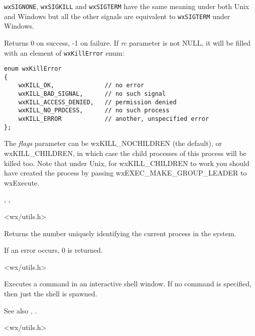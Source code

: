 {\tt wxSIGNONE}, {\tt wxSIGKILL} and {\tt wxSIGTERM} have the same meaning
under both Unix and Windows but all the other signals are equivalent to
{\tt wxSIGTERM} under Windows.

Returns 0 on success, -1 on failure. If {\it rc} parameter is not NULL, it will
be filled with an element of {\tt wxKillError} enum:

\begin{verbatim}
enum wxKillError
{
    wxKILL_OK,              // no error
    wxKILL_BAD_SIGNAL,      // no such signal
    wxKILL_ACCESS_DENIED,   // permission denied
    wxKILL_NO_PROCESS,      // no such process
    wxKILL_ERROR            // another, unspecified error
};
\end{verbatim}

The {\it flags} parameter can be wxKILL\_NOCHILDREN (the default),
or wxKILL\_CHILDREN, in which case the child processes of this
process will be killed too. Note that under Unix, for wxKILL\_CHILDREN
to work you should have created the process by passing wxEXEC\_MAKE\_GROUP\_LEADER
to wxExecute.


,\rtfsp
{},\rtfsp
{}


<wx/utils.h>


\label{wxgetprocessid}


Returns the number uniquely identifying the current process in the system.

If an error occurs, $0$ is returned.


<wx/utils.h>


\label{wxshell}


Executes a command in an interactive shell window. If no command is
specified, then just the shell is spawned.

See also , .


<wx/utils.h>


\label{wxshutdown}

